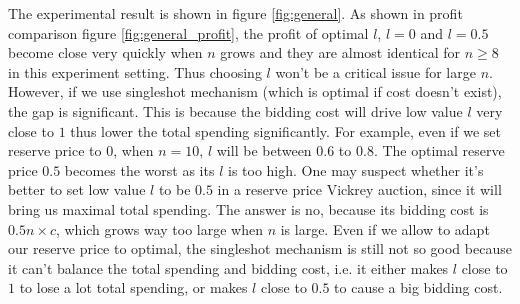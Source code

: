 The experimental result is shown in figure \ref{fig:general}. As shown in
profit comparison figure \ref{fig:general_profit}, the profit of optimal $l$,
$l = 0$ and $l = 0.5$ become close very quickly when $n$ grows and they are
almost identical for $n \geq 8$ in this experiment setting. Thus choosing $l$
won't be a critical issue for large $n$. However, if we use singleshot
mechanism (which is optimal if cost doesn't exist), the gap is significant.
This is because the bidding cost will drive low value $l$ very
close to $1$ thus lower the total spending significantly. For example, even if
we set reserve price to $0$, when $n = 10$, $l$ will be between $0.6$ to $0.8$.
The optimal reserve price $0.5$ becomes the worst as its $l$ is too high. One may
suspect whether it's better to set low value $l$ to be $0.5$ in a reserve price
Vickrey auction, since it will bring us maximal total spending. The answer is no,
because its bidding cost is $0.5 n \times c$, which grows way too large when $n$
is large.
Even if we allow to adapt our reserve price to optimal, the singleshot mechanism is
still not so good because it can't balance the total spending and bidding cost,
i.e. it either makes $l$ close to $1$ to lose a lot total spending, or makes
$l$ close to $0.5$ to cause a big bidding cost.
